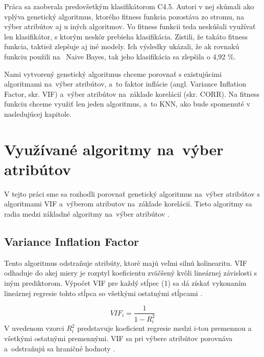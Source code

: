 \documentclass[runningheads]{llncs}
\begin{document}
Práca \cite{ref_smith} sa zaoberala predovšetkým klasifikátorom C4.5.
Autori v nej skúmali ako vplýva genetický algoritmus, ktorého fitness funkcia pozostáva zo stromu, 
na výber atribútov aj u iných algoritmov. Vo fitness funkcii teda neskúšali využívať len
klasifikátor, s ktorým neskôr prebieha klasifikácia. Zistili, že takáto fitness funkcia,
taktiež zlepšuje aj iné modely. Ich výsledky ukázali, že ak rovnakú funkciu použili na~
Naive Bayes, tak jeho klasifikácia sa zlepšila o 4,92 \%.

Nami vytvorený genetický algoritmus chceme porovnať s existujúcimi algoritmami na~výber 
atribútov, a~to faktor inflácie (angl. Variance Inflation Factor, skr. VIF) a~výber atribútov na~základe korelácií (skr. CORR).  
Na fitness funkciu chceme využiť len jeden algoritmus, a~to KNN, ako bude spomenuté v nasledujúcej kapitole.


\section{Využívané algoritmy na~výber atribútov}
V tejto práci sme sa rozhodli porovnať genetický algoritmus na~výber atribútov s
algoritmami VIF a~výberom atributov na~základe korelácií. Tieto 
algoritmy sa radia medzi základné algoritmy na~výber atribútov \cite{ref_xu}.
\subsection{Variance Inflation Factor}
Tento algoritmus odstraňuje atribúty, ktoré majú veľmi silnú kolinearitu.
VIF odhaduje do akej miery je rozptyl koeficientu zväčšený kvôli lineárnej závislosti
s iným prediktorom. Výpočet VIF pre každý stĺpec (1) sa dá získať vykonaním lineárnej 
regresie tohto stĺpca so všetkými ostatnými stĺpcami \cite{ref_xu}.

\begin{equation}
VIF_{i}=\frac{1}{1-R_{i}^{2}}
\end{equation}    
V uvedenom vzorci \begin{math}R_i^2\end{math} predstavuje koeficient regresie medzi i-tou premennou a~
všetkými ostatnými premennými. VIF sa pri výbere atribútov porovnáva a~odstraňujú sa hraničné hodnoty \cite{ref_xu}.
\end{document}
